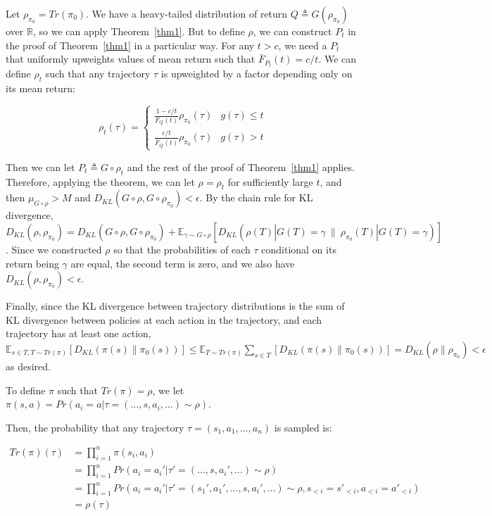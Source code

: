 \documentclass{article}
\theoremstyle{plain}
\theoremstyle{definition}
\theoremstyle{remark}
\begin{document}
Let \(\rho_{\pi_0} = Tr(\pi_0)\). We have a heavy-tailed distribution of
return \(Q \triangleq G(\rho_{\pi_0})\) over \(\mathbb R\), so we can
apply Theorem~\ref{thm1}. But to define \(\rho\), we can construct \(P_t\) in the
proof of Theorem~\ref{thm1} in a particular way. For any \(t>c\), we need a
\(P_t\) that uniformly upweights values of mean return such that
\(\bar F_{P_t}(t) = c/t\). We can define \(\rho_t\) such that any
trajectory \(\tau\) is upweighted by a factor depending only on its mean
return:

\[
\rho_t(\tau) = \begin{cases} \frac{1 - c/t}{F_Q(t)} \rho_{\pi_0}(\tau) & g(\tau) \le t
\\ \frac{c/t}{\bar F_Q(t)}\rho_{\pi_0}(\tau) & g(\tau) > t
\end{cases}
\]

Then we can let \(P_t \triangleq G \circ \rho_t\) and the rest of the
proof of Theorem~\ref{thm1} applies. Therefore, applying the theorem, we can let
\(\rho = \rho_t\) for sufficiently large \(t\), and then
\(\mu_{G \circ \rho} > M\) and
\(D_{KL}(G \circ \rho, G \circ \rho_{\pi_0}) < \epsilon\). By the
chain rule for KL divergence,
\(D_{KL}(\rho, \rho_{\pi_0}) = D_{KL}(G\circ \rho, G \circ \rho_{\pi_0}) + \mathbb E_{\gamma \sim G\circ\rho}[D_{KL}(\rho(T) | G(T)=\gamma \ \|\ \rho_{\pi_0}(T) | G(T)=\gamma)]\).
Since we constructed \(\rho\) so that the probabilities of each \(\tau\)
conditional on its return being \(\gamma\) are equal, the second term is
zero, and we also have \(D_{KL}(\rho, \rho_{\pi_0}) < \epsilon\).

Finally, since the KL divergence between trajectory distributions is the
sum of KL divergence between policies at each action in the trajectory,
and each trajectory has at least one action,
\(\mathbb E_{s \in T, T\sim Tr(\pi)}[D_{KL}(\pi(s) \| \pi_0(s))] \le \mathbb E_{T\sim Tr(\pi)} \sum_{s \in T}[D_{KL}(\pi(s) \| \pi_0(s))] = D_{KL}(\rho \| \rho_{\pi_0}) < \epsilon\)
as desired.

To define \(\pi\) such that \(Tr(\pi) = \rho\), we let
\(\pi(s, a) = Pr(a_i = a | \tau = (..., s, a_i, ...) \sim \rho)\).

Then, the probability that any trajectory
\(\tau = (s_1, a_1, \dots, a_n)\) is sampled is:

\begin{align}
Tr(\pi)(\tau) &= \prod_{i=1}^n \pi(s_i, a_i) 
\\&= \prod_{i=1}^n Pr(a_i=a_i' | \tau' = (..., s, a_i', ...) \sim \rho)
\\&= \prod_{i=1}^n Pr(a_i = a_i' | \tau' = (s_1', a_1', ..., s, a_i', ...) \sim \rho, s_{<i} = s'_{<i}, a_{<i} = a'_{<i})
\\&= \rho(\tau)
\end{align}
\end{document}
